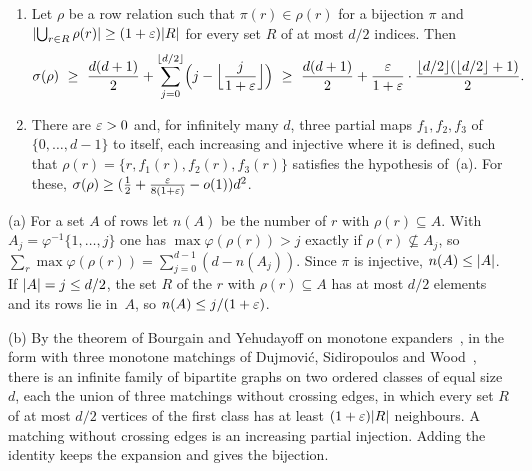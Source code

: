 \begin{proposition}\label{prop:expanding}
\begin{enumerate}[label=(\alph*),leftmargin=2em]
\item Let $\rho$ be a row relation such that $\pi(r)\in\rho(r)$ for a bijection $\pi$ and
$\lvert \bigcup_{r\in R}\rho(r) \rvert\ge(1+\varepsilon)\lvert R \rvert$ for every set $R$ of at most $d/2$ indices. Then
\[
  \sigma(\rho)\ \ge\ \frac{d(d+1)}2+\sum_{j=0}^{\lfloor d/2\rfloor}\Bigl(j-\Bigl\lfloor\frac j{1+\eps}\Bigr\rfloor\Bigr)
  \ \ge\ \frac{d(d+1)}2+\frac\eps{1+\eps}\cdot\frac{\lfloor d/2\rfloor(\lfloor d/2\rfloor+1)}2 .
\]
\item There are $\varepsilon>0$ and, for infinitely many $d$, three partial maps $f_1,f_2,f_3$ of $\{0,\dots,d-1\}$ to
itself, each increasing and injective where it is defined, such that $\rho(r)=\{r,f_1(r),f_2(r),f_3(r)\}$ satisfies
the hypothesis of~(a). For these, $\sigma(\rho)\ge(\tfrac12+\tfrac{\varepsilon}{8(1+\varepsilon)}-o(1))d^2$.
\end{enumerate}
\end{proposition}

\begin{informalproof}
(a) For a set $A$ of rows let $n(A)$ be the number of $r$ with $\rho(r)\subseteq A$. With
$A_j=\varphi^{-1}\{1,\dots,j\}$ one has $\max\varphi(\rho(r))>j$ exactly if $\rho(r)\not\subseteq A_j$, so
$\sum_r\max\varphi(\rho(r))=\sum_{j=0}^{d-1}(d-n(A_j))$. Since $\pi$ is injective, $n(A)\le\lvert A \rvert$. If
$\lvert A \rvert=j\le d/2$, the set $R$ of the $r$ with $\rho(r)\subseteq A$ has at most $d/2$ elements and its rows lie
in~$A$, so $n(A)\le j/(1+\varepsilon)$.

(b) By the theorem of Bourgain and Yehudayoff on monotone expanders~\cite{BourgainYehudayoff2013}, in the form with
three monotone matchings of Dujmovi\'c, Sidiropoulos and Wood~\cite[Theorems~1 and~2]{DujmovicSidiropoulosWood2016},
there is an infinite family of bipartite graphs on two ordered classes of equal size $d$, each the union of three
matchings without crossing edges, in which every set $R$ of at most $d/2$ vertices of the first class has at least
$(1+\varepsilon)\lvert R \rvert$ neighbours. A matching without crossing edges is an increasing partial injection. Adding the
identity keeps the expansion and gives the bijection.
\end{informalproof}

